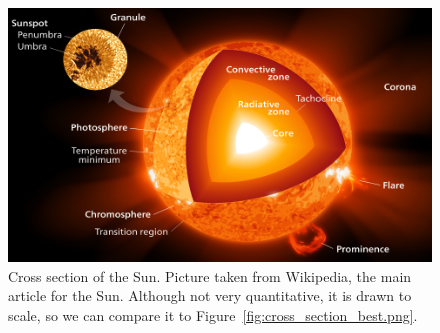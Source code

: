\documentclass[11pt]{article}
\begin{document}
\begin{figure}
    \center
    \includegraphics[width=\linewidth, height=0.3\textheight]{fig/wiki-sun.png}
    \caption{\label{fig:wiki-sun.png} Cross section of the Sun. Picture taken from Wikipedia, the main article for the Sun. Although not very quantitative, it is drawn to scale, so we can compare it to Figure~\ref{fig:cross_section_best.png}.}
\end{figure}
\end{document}
